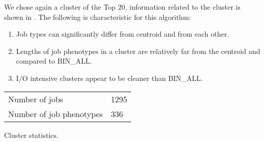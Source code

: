 \documentclass{jhps}
\begin{document}
We chose again a cluster of the Top 20, information related to the cluster is shown in .
The following is characteristic for this algorithm:

\begin{enumerate}
 \item Job types can significantly differ from centroid and from each other.
 \item Lengths of job phenotypes in a cluster are relatively far from the centroid and compared to BIN\_ALL.
 \item I/O intensive clusters appear to be cleaner than BIN\_ALL.
\end{enumerate}

\noindent\begin{minipage}{\textwidth}
\captionsetup{type=table}

\begingroup
  \begin{subtable}{\textwidth}
  \centering
  \begin{tabular}{ll}
    \centering
    Number of jobs & 1295 \\
    Number of job phenotypes & 336 \\
  \end{tabular}
  \caption{Cluster statistics.}
  \label{tab:bin_aggzeros:stats}
  \end{subtable}
\endgroup

\medskip



\end{minipage}
\end{document}
